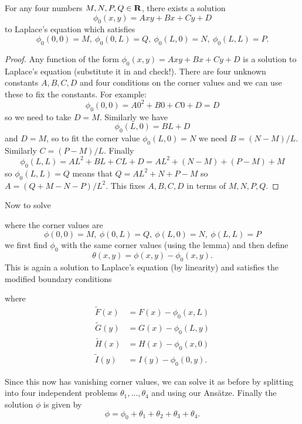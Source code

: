 \begin{lma}
For any four numbers $M,N,P,Q\in\mathbf{R}$, there exists a solution
\[\phi_0(x,y)=Axy+Bx+Cy+D\]
to Laplace's equation which satisfies
\[\phi_0(0,0)=M,\ \phi_0(0,L)=Q,\ \phi_0(L,0)=N,\ \phi_0(L,L)=P.\]
\end{lma}
\begin{proof}
Any function of the form $\phi_0(x,y)=Axy+Bx+Cy+D$ is a solution to Laplace's equation (substitute it in and check!). There are four unknown constants $A,B,C,D$ and four conditions on the corner values and we can use these to fix the constants. For example:
\[\phi_0(0,0)=A0^2+B0+C0+D=D\]
so we need to take $D=M$. Similarly we have
\[\phi_0(L,0)=BL+D\]
and $D=M$, so to fit the corner value $\phi_0(L,0)=N$ we need $B=(N-M)/L$. Similarly $C=(P-M)/L$. Finally
\[\phi_0(L,L)=AL^2+BL+CL+D=AL^2+(N-M)+(P-M)+M\]
so $\phi_0(L,L)=Q$ means that $Q=AL^2+N+P-M$ so $A=(Q+M-N-P)/L^2$. This fixes $A,B,C,D$ in terms of $M,N,P,Q$.
\end{proof}

Now to solve


where the corner values are
\[\phi(0,0)=M,\ \phi(0,L)=Q,\ \phi(L,0)=N,\ \phi(L,L)=P\]
we first find $\phi_0$ with the same corner values (using the lemma) and then define
\[\theta(x,y)=\phi(x,y)-\phi_0(x,y).\]
This is again a solution to Laplace's equation (by linearity) and satisfies the modified boundary conditions


where
\begin{align*}
\tilde{F}(x)&=F(x)-\phi_0(x,L)\\
\tilde{G}(y)&=G(x)-\phi_0(L,y)\\
\tilde{H}(x)&=H(x)-\phi_0(x,0)\\
\tilde{I}(y)&=I(y)-\phi_0(0,y).
\end{align*}

Since this now has vanishing corner values, we can solve it as before by splitting into four independent problems $\theta_1,\ldots,\theta_4$ and using our Ans\"{a}tze. Finally the solution $\phi$ is given by
\[\phi=\phi_0+\theta_1+\theta_2+\theta_3+\theta_4.\]

